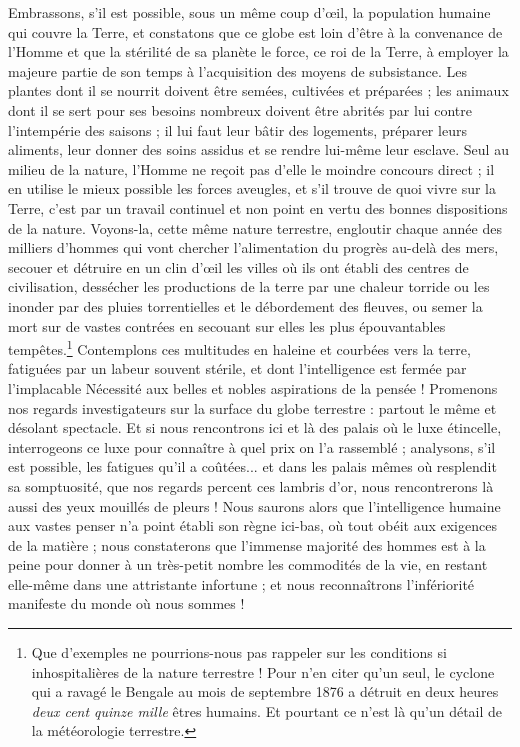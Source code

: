 \documentclass[a4paper, 11pt, oneside]{article}
\begin{document}
Embrassons, s'il est possible, sous un même coup d'œil, la population humaine qui couvre la Terre, et constatons que ce globe est loin d'être à la convenance de l'Homme et que la stérilité de sa planète le force, ce roi de la Terre, à employer la majeure partie de son temps à l'acquisition des moyens de subsistance. Les plantes dont il se nourrit doivent être semées, cultivées et préparées ; les animaux dont il se sert pour ses besoins nombreux doivent être abrités par lui contre l'intempérie des saisons ; il lui faut leur bâtir des logements, préparer leurs aliments, leur donner des soins assidus et se rendre lui-même leur esclave. Seul au milieu de la nature, l'Homme ne reçoit pas d'elle le moindre concours direct ; il en utilise le mieux possible les forces aveugles, et s'il trouve de quoi vivre sur la Terre, c'est par un travail continuel et non point en vertu des bonnes dispositions de la nature. Voyons-la, cette même nature terrestre, engloutir chaque année des milliers d'hommes qui vont chercher l'alimentation du progrès au-delà des mers, secouer et détruire en un clin d'œil les villes où ils ont établi des centres de civilisation, dessécher les productions de la terre par une chaleur torride ou les inonder par des pluies torrentielles et le débordement des fleuves, ou semer la mort sur de vastes contrées en secouant sur elles les plus épouvantables tempêtes.\footnote{Que d'exemples ne pourrions-nous pas rappeler sur les conditions si inhospitalières de la nature terrestre ! Pour n'en citer qu'un seul, le cyclone qui a ravagé le Bengale au mois de septembre 1876 a détruit en deux heures \emph{deux cent quinze mille} êtres humains. Et pourtant ce n'est là qu'un détail de la météorologie terrestre.} Contemplons ces multitudes en haleine et courbées vers la terre, fatiguées par un labeur souvent stérile, et dont l'intelligence est fermée par l'implacable Nécessité aux belles et nobles aspirations de la pensée ! Promenons nos regards investigateurs sur la surface du globe terrestre : partout le même et désolant spectacle. Et si nous rencontrons ici et là des palais où le luxe étincelle, interrogeons ce luxe pour connaître à quel prix on l'a rassemblé ; analysons, s'il est possible, les fatigues qu'il a coûtées... et dans les palais mêmes où resplendit sa somptuosité, que nos regards percent ces lambris d'or, nous rencontrerons là aussi des yeux mouillés de pleurs ! Nous saurons alors que l'intelligence humaine aux vastes penser n'a point établi son règne ici-bas, où tout obéit aux exigences de la matière ; nous constaterons que l'immense majorité des hommes est à la peine pour donner à un très-petit nombre les commodités de la vie, en restant elle-même dans une attristante infortune ; et nous reconnaîtrons l'infériorité manifeste du monde où nous sommes !
\end{document}

